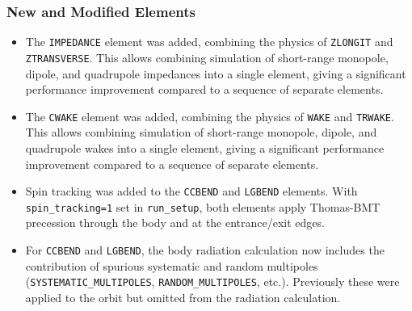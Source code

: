 \documentclass[11pt]{article}
\begin{document}
\subsubsection{New and Modified Elements}
\begin{itemize}
\item The \verb|IMPEDANCE| element was added, combining the physics of \verb|ZLONGIT| and \verb|ZTRANSVERSE|. This allows
  combining simulation of short-range monopole, dipole, and quadrupole impedances into a single element, giving a
  significant performance improvement compared to a sequence of separate elements.
\item The \verb|CWAKE| element was added, combining the physics of \verb|WAKE| and \verb|TRWAKE|. This allows combining
  simulation  of short-range monopole, dipole, and quadrupole wakes into a single element, giving a
  significant performance improvement compared to a sequence of separate elements.
\item Spin tracking was added to the \verb|CCBEND| and \verb|LGBEND| elements. With \verb|spin_tracking=1| set
  in \verb|run_setup|, both elements apply Thomas-BMT precession through the body and at the entrance/exit
  edges.
\item For \verb|CCBEND| and \verb|LGBEND|, the body radiation calculation now includes the contribution of
  spurious systematic and random multipoles ({\tt SYSTEMATIC\_MULTIPOLES}, {\tt RANDOM\_MULTIPOLES}, etc.). 
  Previously these were applied to the orbit but omitted from the
  radiation calculation. 
\end{itemize}
\end{document}
